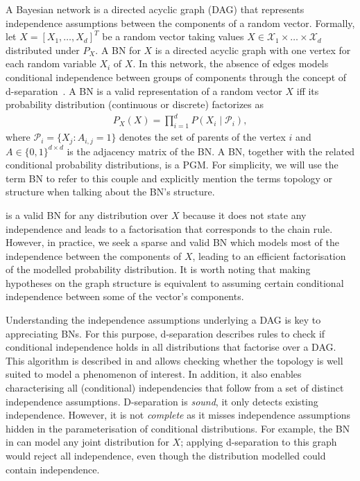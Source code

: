 A Bayesian network is a directed acyclic graph (DAG) that represents independence assumptions between the components of a random vector. Formally, let $X = \left[X_1, \hdots, X_d\right]^T$ be a random vector taking values $X \in \mathcal{X}_1 \times \dots \times \mathcal{X}_d$ distributed under $P_{X}$. A BN for $X$ is a directed acyclic graph with one vertex for each random variable $X_i$ of $X$. In this network, the absence of edges models conditional independence between groups of components through the concept of d-separation~\citep{d-separation}. A BN is a valid representation of a random vector $X$ iff its probability distribution (continuous or discrete) factorizes as
\begin{align}
    P_{X}(X) = \prod^d_{i=1}P(X_i\mid \mathcal{P}_i),\label{eq:BN-fact}
\end{align}
where  $\mathcal{P}_i = \{X_j: A_{i,j} = 1 \}$ denotes the set of parents of the vertex $i$ and $A \in \{0, 1\}^{d\times d}$ is the adjacency matrix of the BN. A BN, together with the related conditional probability distributions, is a PGM. For simplicity, we will use the term BN to refer to this couple and explicitly mention the terms topology or structure when talking about the BN's structure.

 is a valid BN for any distribution over $X$ because it does not state any independence and leads to a factorisation that corresponds to the chain rule. However, in practice, we seek a sparse and valid BN which models most of the independence between the components of $X$, leading to an efficient factorisation of the modelled probability distribution. It is worth noting that making hypotheses on the graph structure is equivalent to assuming certain conditional independence between some of the vector's components.

Understanding the independence assumptions underlying a DAG is key to appreciating BNs. For this purpose, d-separation describes rules to check if conditional independence holds in all distributions that factorise over a DAG. This algorithm is described in  and allows checking whether the topology is well suited to model a phenomenon of interest. In addition, it also enables characterising all (conditional) independencies that follow from a set of distinct independence assumptions. D-separation is \textit{sound}, it only detects existing independence. However, it is not \textit{complete} as it misses independence assumptions hidden in the parameterisation of conditional distributions. For example, the BN in  can model any joint distribution for $X$; applying d-separation to this graph would reject all independence, even though the distribution modelled could contain independence.
